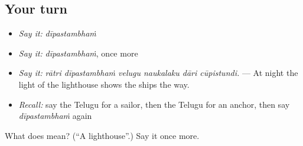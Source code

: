 \subsection*{Your turn}
\begin{itemize}
\raggedright
  \item \emph{Say it:} \emph{dīpastambhaṁ}
  \item \emph{Say it:} \emph{dīpastambhaṁ}, once more
  \item \emph{Say it:} \emph{rātri dīpastambhaṁ velugu naukalaku dāri cūpistundi.} — At night the light of the lighthouse shows the ships the way.
  \item \emph{Recall:} say the Telugu for a sailor, then the Telugu for an anchor, then say \emph{dīpastambhaṁ} again
\end{itemize}

\begin{tcolorbox}[breakable,colback=teal!4,colframe=teal!35!black,title={Before you move on}]
What does  mean? (\textquotedblleft{}A lighthouse\textquotedblright{}.) Say it once more.
\end{tcolorbox}
